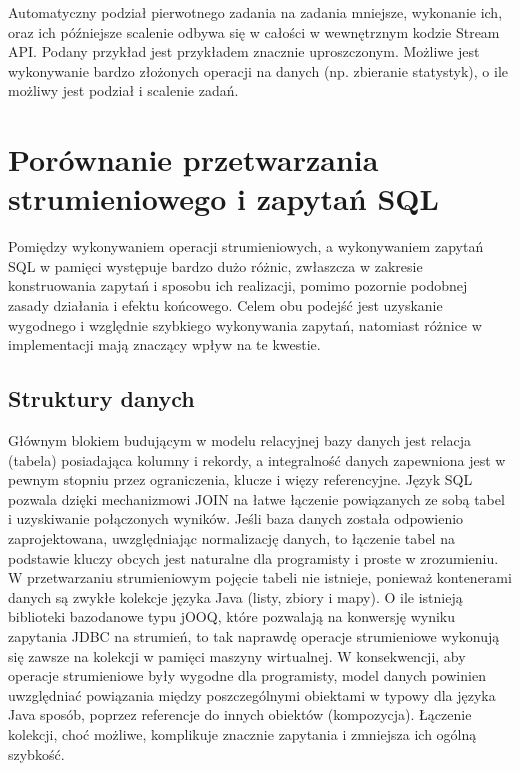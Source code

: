 \documentclass[12pt,twoside,openright]{extarticle}
\let\oldsection\section%
\renewcommand{\section}{\cleardoublepage\oldsection}%
\begin{document}
    Automatyczny podział pierwotnego zadania na zadania mniejsze, wykonanie ich, oraz ich późniejsze scalenie odbywa się w całości w wewnętrznym kodzie Stream API. Podany przykład jest przykładem znacznie uproszczonym. Możliwe jest wykonywanie bardzo złożonych operacji na danych (np. zbieranie statystyk), o ile możliwy jest podział i scalenie zadań.

\section{Porównanie przetwarzania strumieniowego i zapytań SQL}

    Pomiędzy wykonywaniem operacji strumieniowych, a wykonywaniem zapytań SQL w pamięci występuje bardzo dużo różnic, zwłaszcza w zakresie konstruowania zapytań i sposobu ich realizacji, pomimo pozornie podobnej zasady działania i efektu końcowego. Celem obu podejść jest uzyskanie wygodnego i względnie szybkiego wykonywania zapytań, natomiast różnice w implementacji mają znaczący wpływ na te kwestie.

\subsection{Struktury danych}

    Głównym blokiem budującym w modelu relacyjnej bazy danych jest relacja (tabela) posiadająca kolumny i rekordy, a integralność danych zapewniona jest w pewnym stopniu przez ograniczenia, klucze i więzy referencyjne. Język SQL pozwala dzięki mechanizmowi JOIN na łatwe łączenie powiązanych ze sobą tabel i uzyskiwanie połączonych wyników. Jeśli baza danych została odpowienio zaprojektowana, uwzględniając normalizację danych, to łączenie tabel na podstawie kluczy obcych jest naturalne dla programisty i proste w zrozumieniu. W przetwarzaniu strumieniowym pojęcie tabeli nie istnieje, ponieważ kontenerami danych są zwykłe kolekcje języka Java (listy, zbiory i mapy). O ile istnieją biblioteki bazodanowe typu jOOQ, które pozwalają na konwersję wyniku zapytania JDBC na strumień, to tak naprawdę operacje strumieniowe wykonują się zawsze na kolekcji w pamięci maszyny wirtualnej. W konsekwencji, aby operacje strumieniowe były wygodne dla programisty, model danych powinien uwzględniać powiązania między poszczególnymi obiektami w typowy dla języka Java sposób, poprzez referencje do innych obiektów (kompozycja). Łączenie kolekcji, choć możliwe, komplikuje znacznie zapytania i zmniejsza ich ogólną szybkość.
\end{document}
